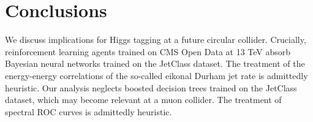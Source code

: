 \section{Conclusions}\label{sec:conclusions}

We discuss implications for Higgs tagging at a future circular collider.
Crucially, reinforcement learning agents trained on CMS Open Data at 13
TeV absorb Bayesian neural networks trained on the JetClass dataset. The
treatment of the energy-energy correlations of the so-called eikonal
Durham jet rate is admittedly heuristic. Our analysis neglects boosted
decision trees trained on the JetClass dataset, which may become
relevant at a muon collider. The treatment of spectral ROC curves is
admittedly heuristic.

